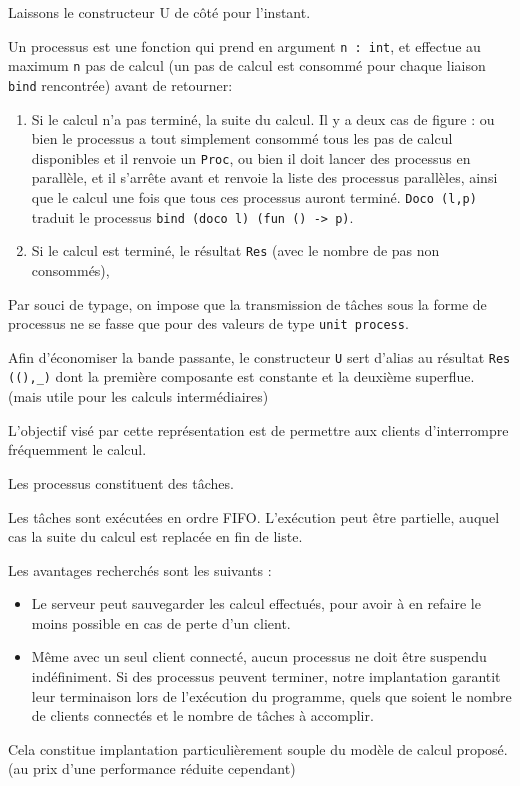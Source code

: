 \documentclass[11pt]{article}
\begin{document}
Laissons le constructeur U de c\^ot\'e pour l'instant.

Un processus est une fonction qui prend en argument {\tt n : int},
et effectue au maximum {\tt n} pas de calcul
(un pas de calcul est consomm\'e pour chaque liaison {\tt bind} rencontr\'ee)
avant de retourner:

\begin{enumerate}
  \item Si le calcul n'a pas termin\'e, la suite du calcul.
    Il y a deux cas de figure : ou bien le processus a tout simplement
    consomm\'e tous les pas de calcul disponibles
    et il renvoie un {\tt Proc},
    ou bien il doit lancer des processus en parall\`ele, et il s'arr\^ete
    avant et renvoie la liste des processus parall\`eles,
    ainsi que le calcul une fois que tous ces processus auront termin\'e.
    {\tt Doco (l,p)} traduit le processus
    {\tt bind (doco l) (fun () -> p)}.
  \item Si le calcul est termin\'e, le r\'esultat {\tt Res}
    (avec le nombre de pas non consomm\'es),
\end{enumerate}

Par souci de typage, on impose que la transmission de
t\^aches sous la forme de processus ne se fasse que pour des valeurs
de type {\tt unit process}.

Afin d'\'economiser la bande passante,
le constructeur {\tt U} sert d'alias au r\'esultat {\tt Res ((),\_)}
dont la premi\`ere composante est constante et la deuxi\`eme superflue.
(mais utile pour les calculs interm\'ediaires)

\smallskip

L'objectif vis\'e par cette repr\'esentation est
de permettre aux clients d'interrompre fr\'equemment le calcul.

Les processus constituent des t\^aches.

Les t\^aches sont ex\'ecut\'ees en ordre FIFO.
L'ex\'ecution peut \^etre partielle,
auquel cas la suite du calcul est replac\'ee en fin de liste.

\smallskip

Les avantages recherch\'es sont les suivants :

\begin{itemize}
  \item Le serveur peut sauvegarder les calcul effectu\'es,
    pour avoir \`a en refaire le moins possible en cas de perte d'un client.
  \item M\^eme avec un seul client connect\'e,
    aucun processus ne doit \^etre suspendu ind\'efiniment.
    Si des processus peuvent terminer, notre implantation garantit leur
    terminaison lors de l'ex\'ecution du programme, quels que soient
    le nombre de clients connect\'es et le nombre de t\^aches \`a accomplir.
\end{itemize}

Cela constitue implantation particuli\`erement souple
du mod\`ele de calcul propos\'e.
(au prix d'une performance r\'eduite cependant)
\end{document}
